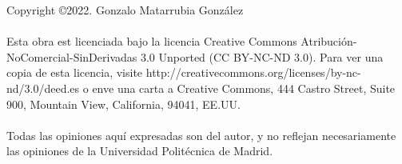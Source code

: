 \begin{flushleft}

Copyright \copyright 2022. Gonzalo Matarrubia González


\paragraph{} Esta obra est licenciada bajo la licencia
Creative Commons Atribución-NoComercial-SinDerivadas 3.0 Unported (CC BY-NC-ND 3.0).
Para ver una copia de esta licencia, visite http://creativecommons.org/licenses/by-nc-nd/3.0/deed.es
o enve una carta a Creative Commons, 444 Castro Street, Suite 900, Mountain View, California,
 94041, EE.UU.

\paragraph{} Todas las opiniones aquí expresadas son del autor, y no reflejan necesariamente las opiniones
de la Universidad Politécnica de Madrid.

\end{flushleft}